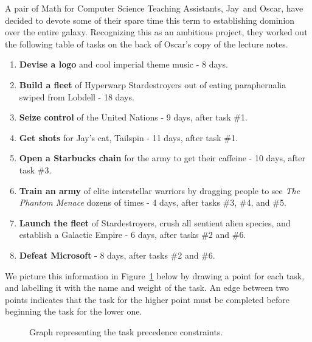
\begin{pcomments}
\end{pcomments}


\newcommand{\Jay}{Jay}
\newcommand{\Rongrong}{Oscar}


\begin{problem}
A pair of Math for Computer Science Teaching Assistants, \Jay\ and
\Rongrong, have decided to devote some of their spare time this term
to establishing dominion over the entire galaxy.  Recognizing this as
an ambitious project, they worked out the following table of tasks on
the back of \Rongrong's copy of the lecture notes.

\begin{enumerate}
\item \textbf{Devise a logo} and cool imperial theme music - 8 days.
\item \textbf{Build a fleet} of Hyperwarp Stardestroyers out of eating
  paraphernalia swiped from Lobdell - 18 days.
\item \textbf{Seize control} of the United Nations - 9 days, after task \#1.
\item \textbf{Get shots} for \Jay's cat, Tailspin - 11 days, after task \#1.
\item \textbf{Open a Starbucks chain} for the army to get their caffeine - 10 
days, after task \#3.
\item \textbf{Train an army} of elite interstellar warriors by dragging
people to see \emph{The Phantom Menace} dozens of times - 4 days, after
tasks \#3, \#4, and \#5.
\item \textbf{Launch the fleet} of Stardestroyers, crush all sentient
alien species, and establish a Galactic Empire - 6 days, after tasks \#2 and
\#6.
\item \textbf{Defeat Microsoft} - 8 days, after tasks \#2 and \#6.
\end{enumerate}

We picture this information in Figure~\ref{fig:tasks} below by drawing a
point for each task, and labelling it with the name and weight of the
task.  An edge between two points indicates that the task for the higher
point must be completed before beginning the task for the lower one.
    \begin{figure}[htbp]
    \begin{center}
    \unitlength=0.047pt
    
    \end{center}
    \caption{Graph representing the task precedence constraints.}
    \label{fig:tasks}
    \end{figure}


\end{problem}
